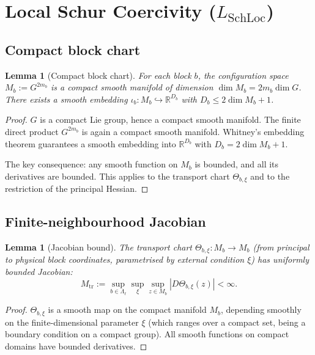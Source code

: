 \documentclass[12pt]{article}
\theoremstyle{plain}
\newtheorem{lemma}[theorem]{Lemma}
\theoremstyle{definition}
\numberwithin{equation}{section}
\newcommand{\R}{\mathbb{R}}
\newcommand{\tr}{\mathrm{tr}}
\begin{document}
\section{Local Schur Coercivity ($L_{\mathrm{SchLoc}}$)}\label{sec:LSchLoc}

\subsection{Compact block chart}

\begin{lemma}[Compact block chart]\label{lem:compactchart}
For each block $b$, the configuration space $M_b:=G^{2m_b}$ is a compact smooth manifold of dimension $\dim M_b=2m_b\dim G$.  There exists a smooth embedding $\iota_b:M_b\hookrightarrow\R^{D_b}$ with $D_b\leq 2\dim M_b+1$.
\end{lemma}

\begin{proof}
$G$ is a compact Lie group, hence a compact smooth manifold.  The finite direct product $G^{2m_b}$ is again a compact smooth manifold.  Whitney's embedding theorem guarantees a smooth embedding into $\R^{D_b}$ with $D_b=2\dim M_b+1$.

The key consequence: any smooth function on $M_b$ is bounded, and all its derivatives are bounded.  This applies to the transport chart $\Theta_{b,\xi}$ and to the restriction of the principal Hessian.
\end{proof}

\subsection{Finite-neighbourhood Jacobian}

\begin{lemma}[Jacobian bound]\label{lem:jacobian}
The transport chart $\Theta_{b,\xi}:M_b\to M_b$ (from principal to physical block coordinates, parametrised by external condition $\xi$) has uniformly bounded Jacobian:
\begin{equation}
M_{\tr} := \sup_{b\in\Lambda_\ell}\sup_{\xi}\sup_{z\in M_b}|D\Theta_{b,\xi}(z)| < \infty.
\end{equation}
\end{lemma}

\begin{proof}
$\Theta_{b,\xi}$ is a smooth map on the compact manifold $M_b$, depending smoothly on the finite-dimensional parameter $\xi$ (which ranges over a compact set, being a boundary condition on a compact group).  All smooth functions on compact domains have bounded derivatives.
\end{proof}
\end{document}
